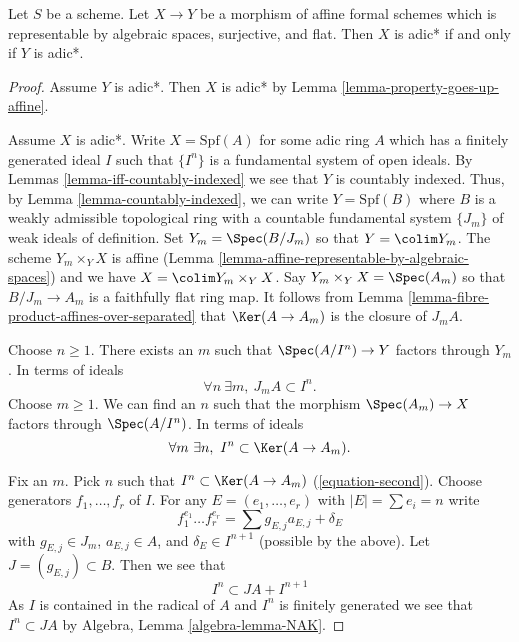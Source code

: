 \begin{lemma}
\label{lemma-iff-adic-star}
Let $S$ be a scheme. Let $X \to Y$ be a morphism of affine
formal schemes which is representable by algebraic spaces,
surjective, and flat. Then $X$ is adic* if and only if $Y$ is adic*.
\end{lemma}

\begin{proof}
Assume $Y$ is adic*. Then $X$ is adic* by
Lemma \ref{lemma-property-goes-up-affine}.

\medskip\noindent
Assume $X$ is adic*. Write $X = \text{Spf}(A)$ for some adic ring $A$
which has a finitely generated ideal $I$ such that $\{I^n\}$ is a
fundamental system of open ideals. By Lemmas \ref{lemma-iff-countably-indexed}
we see that $Y$ is countably indexed. Thus, by
Lemma \ref{lemma-countably-indexed},
we can write $Y = \text{Spf}(B)$ where $B$ is a weakly admissible
topological ring with a countable fundamental system $\{J_m\}$ of
weak ideals of definition. Set $Y_m = \Spec(B/J_m)$ so that
$Y = \colim Y_m$. The scheme $Y_m \times_Y X$ is affine
(Lemma \ref{lemma-affine-representable-by-algebraic-spaces})
and we have $X = \colim Y_m \times_Y X$. Say $Y_m \times_Y X = \Spec(A_m)$
so that $B/J_m \to A_m$ is a faithfully flat ring map.
It follows from Lemma \ref{lemma-fibre-product-affines-over-separated}
that $\Ker(A \to A_m)$ is the closure of $J_mA$.

\medskip\noindent
Choose $n \geq 1$. There exists an $m$ such that $\Spec(A/I^n) \to Y$
factors through $Y_m$. In terms of ideals
\begin{equation}
\label{equation-first}
\forall n\ \exists m,\ J_m A \subset I^n.
\end{equation}
Choose $m \geq 1$. We can find an $n$ such that the morphism
$\Spec(A_m) \to X$ factors through $\Spec(A/I^n)$. In terms of ideals
\begin{equation}
\label{equation-second}
\forall m\ \exists n,\ I^n \subset \Ker(A \to A_m).
\end{equation}

\medskip\noindent
Fix an $m$. Pick $n$ such that $I^n \subset \Ker(A \to A_m)$
(\ref{equation-second}). Choose generators $f_1, \ldots, f_r$
of $I$. For any $E = (e_1, \ldots, e_r)$ with $|E| = \sum e_i = n$ write
$$
f_1^{e_1} \ldots f_r^{e_r} =
\sum g_{E, j} a_{E, j} + \delta_E
$$
with $g_{E, j} \in J_m$, $a_{E, j} \in A$, and $\delta_E \in I^{n + 1}$
(possible by the above). Let $J = (g_{E, j}) \subset B$.
Then we see that
$$
I^n \subset J A + I^{n + 1}
$$
As $I$ is contained in the radical of $A$ and $I^n$ is finitely generated
we see that $I^n \subset JA$ by Algebra, Lemma \ref{algebra-lemma-NAK}.


\end{proof}
